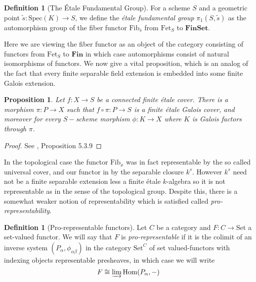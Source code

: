 \documentclass{article}
\theoremstyle{definition}
\newtheorem{definition}[theorem]{Definition}
\theoremstyle{remark}
\theoremstyle{plain}
\newtheorem{proposition}[theorem]{Proposition}
\begin{document}
\begin{definition}[The \'Etale Fundamental Group]
	For a scheme $S$ and a geometric point $\widetilde{s}: \text{Spec}(K) \to S$, we define the \textit{\'etale fundamental group} $\pi_1(S, \widetilde{s})$ as the automorphism group of the fiber functor $\text{Fib}_{\overline{s}}$ from $\text{Fet}_{S}$ to $\textbf{FinSet}$.
\end{definition}

Here we are viewing the fiber functor as an object of the category consisting of functors from $\text{Fet}_S$ to $\textbf{Fin}$ in which case automorphisms consist of natural isomorphisms of functors.
We now give a vital proposition, which is an analog of the fact that every finite separable field extension is embedded into some finite Galois extension.  


\begin{proposition}
	Let $f: X \to S$ be a connected finite \'etale cover. 
	There is a morphism $\pi: P \to X$ such that $f \circ \pi: P \to S$ is a finite \'etale Galois cover, and moreover for every $S-$scheme morphism $\phi:K  \to X$ where $K$ is Galois factors through $\pi$.
\end{proposition}

\begin{proof}
	See \cite{Szamuely}, Proposition 5.3.9
\end{proof}

In the topological case the functor $\text{Fib}_x$ was in fact representable by the so called universal cover, and our functor in  by the separable closure $k^s$.
However $k^s$ need not be a finite separable extension less a finite \'etale $k$-algebra so it is not representable as in the sense of the topological group.
Despite this, there is a somewhat weaker notion of representability which is satisfied called \textit{pro-representability}.

\begin{definition}[Pro-representable functors]
	Let $C$ be a category and $F: C \to \text{Set}$ a set-valued functor.
	We will say that $F$ is \textit{pro-representable} if it is the colimit of an inverse system $(P_{\alpha}, \phi_{\alpha \beta})$ in the category $\text{Set}^C$ of set valued-functors with indexing objects representable presheaves, in which case we will write 
\[F \cong \varinjlim \text{Hom}(P_{\alpha}, -)\]
\end{definition} 
\end{document}

